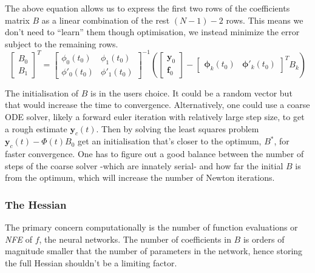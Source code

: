 \documentclass{article}
\begin{document}
    The above equation allows us to express the first two rows of the coefficients matrix $B$ as a linear combination
    of the rest $(N-1)-2$ rows.
    This means we don't need to ``learn'' them though optimisation, we instead minimize the error subject to the
    remaining rows.
    \begin{equation}
        \label{eq:phi_f2}
        \begin{bmatrix}
            B_0 \\ B_1
        \end{bmatrix}^T
        =
        \begin{bmatrix}
            \phi_0(t_0)  & \phi_1(t_0)  \\
            \phi'_0(t_0) & \phi'_1(t_0)
        \end{bmatrix}^{-1}
        \left(
        \begin{bmatrix}
            \pmb{y}_0 \\
            \pmb{f}_0
        \end{bmatrix}
        -
        \begin{bmatrix}
            \pmb{\phi}_k(t_0) &
            \pmb{\phi}'_k(t_0)
        \end{bmatrix}^T
        B_k
        \right)
    \end{equation}

    The initialisation of $B$ is in the users choice.
    It could be a random vector but that would increase the time to convergence.
    Alternatively, one could use a coarse ODE solver, likely a forward euler iteration with relatively large step size,
    to get a rough estimate $\pmb{y}_c(t)$.
    Then by solving the least squares problem $\pmb{y}_c(t) - \Phi(t) B_0$ get an initialisation that's closer to the
    optimum, $B^*$, for faster convergence.
    One has to figure out a good balance between the number of steps of the coarse solver -which are innately serial-
    and how far the initial $B$ is from the optimum, which will increase the number of Newton iterations.

    \subsubsection{The Hessian}

    The primary concern computationally is the number of function evaluations or \textit{NFE} of $f$,
    the neural networks.
    The number of coefficients in $B$ is orders of magnitude smaller that the number of parameters in the network,
    hence storing the full Hessian shouldn't be a limiting factor.
\end{document}
